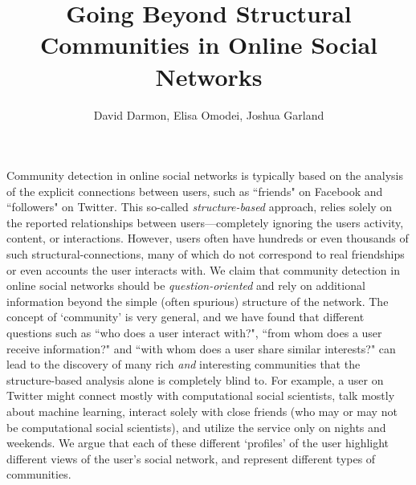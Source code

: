 \documentclass[10pt,a4paper]{article}
\title{Going Beyond Structural Communities in Online Social Networks}
\author{David Darmon, Elisa Omodei, Joshua Garland}
\date{}
\begin{document}
\maketitle




Community detection in online social networks is typically based on the analysis of the explicit connections between users, such as ``friends" on Facebook and ``followers" on Twitter. This so-called \emph{structure-based} approach, relies solely on the reported relationships between users---completely ignoring the users activity, content, or interactions. However, users often have hundreds or even thousands of such structural-connections, many of which do not correspond to real friendships or even accounts the user interacts with. We claim that community detection in online social networks should be \emph{question-oriented} and rely on additional information beyond the simple (often spurious) structure of the network. The concept of `community' is very general, and we have found that different questions such as ``who does a user interact with?", ``from whom does a user receive information?" and ``with whom does a user share similar interests?" can lead to the discovery of many rich \emph{and} interesting communities that the structure-based analysis alone is completely blind to. 
For example, a user on Twitter might connect mostly with computational social scientists, talk mostly about machine learning, interact solely with close friends (who may or may not be computational social scientists), and utilize the service only on nights and weekends. We argue that each of these different `profiles' of the user highlight different views of the user's social network, and represent different types of communities. 
\end{document}
